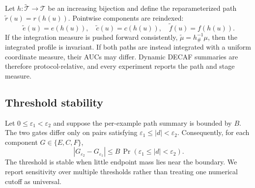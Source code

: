 Let $h:\widetilde{\mathcal T}\rightarrow\mathcal T$ be an increasing bijection and define the reparameterized path $\widetilde r(u)=r(h(u))$. Pointwise components are reindexed:
\begin{equation}
    \widetilde e(u)=e(h(u)),
    \quad
    \widetilde c(u)=c(h(u)),
    \quad
    \widetilde f(u)=f(h(u)).
\end{equation}
If the integration measure is pushed forward consistently, $\widetilde\mu=h^{-1}_{\#}\mu$, then the integrated profile is invariant. If both paths are instead integrated with a uniform coordinate measure, their AUCs may differ. Dynamic DECAF summaries are therefore protocol-relative, and every experiment reports the path and stage measure.

\subsection{Threshold stability}
\label{app:threshold-theory}

Let $0\leq\varepsilon_1<\varepsilon_2$ and suppose the per-example path summary is bounded by $B$. The two gates differ only on pairs satisfying $\varepsilon_1\leq|d|<\varepsilon_2$. Consequently, for each component $G\in\{E,C,F\}$,
\begin{equation}
    |G_{\varepsilon_2}-G_{\varepsilon_1}|
    \leq
    B\,\Pr\!\left(\varepsilon_1\leq|d|<\varepsilon_2\right).
    \label{eq:threshold-bound}
\end{equation}
The threshold is stable when little endpoint mass lies near the boundary. We report sensitivity over multiple thresholds rather than treating one numerical cutoff as universal.
